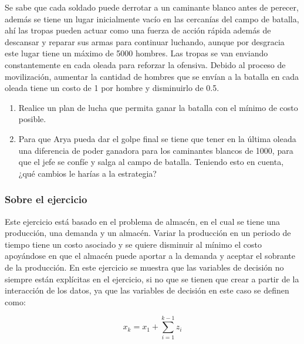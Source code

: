 \documentclass[a4paper,10pt,twocolumn]{article}
\theoremstyle{theorem}
\theoremstyle{definition}
\theoremstyle{remark}
\begin{document}
Se sabe que cada soldado puede derrotar a un caminante blanco antes de perecer, además se tiene un lugar inicialmente vacío en las cercanías del campo de batalla, ahí las tropas pueden actuar como una fuerza de acción rápida además de descansar y reparar sus armas para continuar luchando, aunque por desgracia este lugar tiene un máximo de 5000 hombres. Las tropas se van enviando constantemente en cada oleada para reforzar la ofensiva. Debido al proceso de movilización, aumentar la cantidad de hombres que se envían a la batalla en cada oleada tiene un costo de 1 por hombre y disminuirlo de 0.5.

\renewcommand{\theenumi}{\alph{enumi}} %

\begin{enumerate}

	\item Realice un plan de lucha que permita ganar la batalla con el mínimo de costo posible.
	\item Para que Arya pueda dar el golpe final se tiene que tener en la última oleada una diferencia de poder ganadora para los caminantes 
	blancos de 1000, para que el jefe se confíe y salga al campo de batalla. Teniendo esto en cuenta, ¿qué cambios le harías a la estrategia?

\end{enumerate}

		\subsubsection{Sobre el ejercicio}\label{subsubsec:sobre_ejer_5}

Este ejercicio está basado en el problema de almacén, en el cual se tiene una producción, una demanda y un almacén. Variar la producción en un periodo de tiempo tiene un costo asociado y se quiere disminuir al mínimo el costo apoyándose en que el almacén puede aportar a la demanda y aceptar el sobrante de la producción. En este ejercicio se muestra que las variables de decisión no siempre están explícitas en el ejercicio, si no que se tienen que crear a partir de la interacción de los datos, ya que las variables de decisión en este caso se definen como:

$$
x_k = x_1 + \sum_{i=1}^{k-1}z_i
$$
\end{document}
